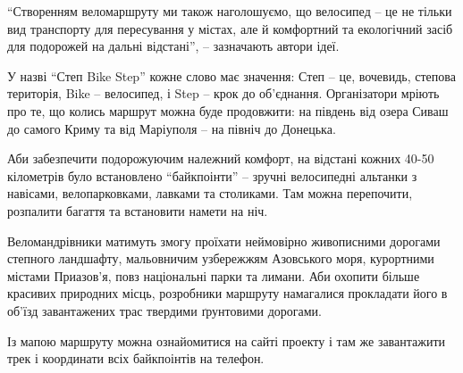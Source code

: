 
\enquote{Створенням веломаршруту ми також наголошуємо, що велосипед – це не тільки вид
транспорту для пересування у містах, але й комфортний та екологічний засіб для
подорожей на дальні відстані}, – зазначають автори ідеї.

У назві \enquote{Степ Bike Step} кожне слово має значення: Степ – це, вочевидь, степова
територія, Bike – велосипед, і Step – крок до об'єднання. Організатори мріють
про те, що колись маршрут можна буде продовжити: на південь від озера Сиваш до
самого Криму та від Маріуполя – на північ до Донецька.


Аби забезпечити подорожуючим належний комфорт, на відстані кожних 40-50
кілометрів було встановлено \enquote{байкпоінти} – зручні велосипедні альтанки з
навісами, велопарковками, лавками та столиками. Там можна перепочити, розпалити
багаття та встановити намети на ніч.


Веломандрівники матимуть змогу проїхати неймовірно живописними дорогами
степного ландшафту, мальовничим узбережжям Азовського моря, курортними містами
Приазов'я, повз національні парки та лимани. Аби охопити більше красивих
природних місць, розробники маршруту намагалися прокладати його в об'їзд
завантажених трас твердими ґрунтовими дорогами.


Із мапою маршруту можна ознайомитися на сайті проекту і там же завантажити трек
і координати всіх байкпоінтів на телефон.

